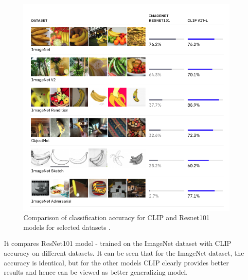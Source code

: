 \documentclass[12pt,a4paper,openany]{book}
\begin{document}
 \begin{figure}[ht!]
     \centering
     \includegraphics[scale=0.5]{figs/clip_summary.png}
     \caption{Comparison of classification accuracy for CLIP and Resnet101 models for selected datasets \cite{clip_blog}.}
 \end{figure}
 \newpage
\noindent It compares ResNet101 model - trained on the ImageNet dataset with CLIP accuracy on different datasets.  It can be seen that for the ImageNet dataset, the accuracy is identical, but for the other models CLIP clearly provides better results and hence can be viewed as better generalizing model.
\newpage
\end{document}
